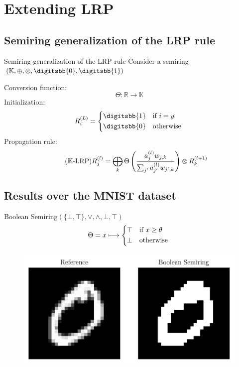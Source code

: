 \documentclass[aspectratio=169]{beamer}
\theoremstyle{definition}
\begin{document}
\section{Extending LRP}
\subsection{Semiring generalization of the LRP rule}
\begin{frame}{Semiring generalization of the LRP rule}
    Consider a semiring $(\mathbb{K}, \oplus, \otimes, \digitsbb{0}, \digitsbb{1})$

    Conversion function:
    \begin{equation*}
        \Theta : \mathbb{R} \longrightarrow \mathbb{K}
    \end{equation*}
    Initialization:
    \begin{equation}
        R^{(L)}_i = \begin{cases*}
            \digitsbb{1} & if $i = y$\\
            \digitsbb{0} & otherwise
        \end{cases*}
    \end{equation}
    Propagation rule:
    \begin{equation}
        \tag{$\mathbb{K}$-LRP}
        R^{(l)}_j = \bigoplus_k \Theta\left(
            \frac{a^{(l)}_jw_{j, k}}{\sum_{j'}a^{(l)}_{j'}w_{j', k}} 
        \right) \otimes R^{(l+1)}_k
    \end{equation}
\end{frame}

\subsection{Results over the MNIST dataset}
\begin{frame}{Boolean Semiring}{\large $(\{\bot, \top\}, \lor, \land, \bot, \top)$}
    \begin{equation*}
        \Theta = x \longmapsto \begin{cases*}
            \top & if $x\geq\theta$\\
            \bot & otherwise
        \end{cases*}
    \end{equation*}

    \begin{figure}[H]
        \centering
        \includegraphics[width=.5\textwidth]{boolean.png}
    \end{figure}
\end{frame}
\end{document}
